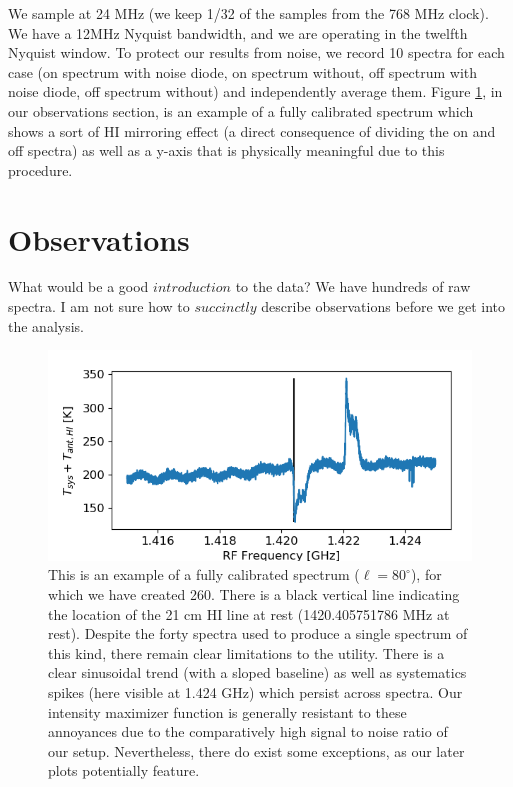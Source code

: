 \documentclass[12pt]{article}
\begin{document}
We sample at 24 MHz (we keep 1/32 of the samples from the 768 MHz clock). We have a 12MHz Nyquist bandwidth, and we are operating in the twelfth Nyquist window. To protect our results from noise, we record 10 spectra for each case (on spectrum with noise diode, on spectrum without, off spectrum with noise diode, off spectrum without) and independently average them. Figure \ref{fig:cal_ex}, in our observations section, is an example of a fully calibrated spectrum which shows a sort of HI mirroring effect (a direct consequence of dividing the on and off spectra) as well as a y-axis that is physically meaningful due to this procedure.

\section{Observations}

\quad \quad What would be a good $introduction$ to the data? We have hundreds of raw spectra. I am not sure how to $succinctly$ describe observations before we get into the analysis.

\begin{figure}
	\centering
	\includegraphics[width=.8\linewidth]{cal_ex_80_deg}
	\caption{This is an example of a fully calibrated spectrum ($\ell = 80^\circ$), for which we have created 260. There is a black vertical line indicating the location of the 21 cm HI line at rest (1420.405751786 MHz at rest). Despite the forty spectra used to produce a single spectrum of this kind, there remain clear limitations to the utility. There is a clear sinusoidal trend (with a sloped baseline) as well as systematics spikes (here visible at 1.424 GHz) which persist across spectra. Our intensity maximizer function is generally resistant to these annoyances due to the comparatively high signal to noise ratio of our setup. Nevertheless, there do exist some exceptions, as our later plots potentially feature.}
	\label{fig:cal_ex}
\end{figure}
\end{document}
